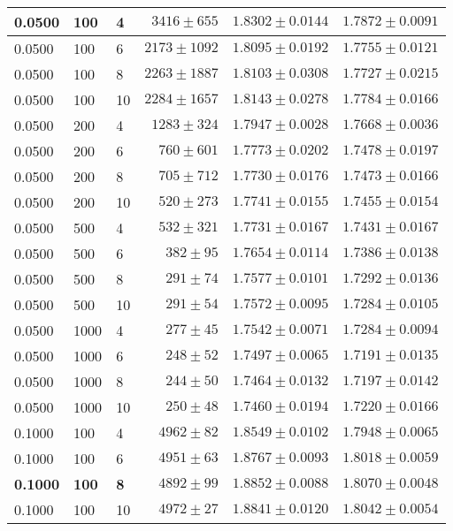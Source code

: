 \begin{table}
\begin{center}
{\begin{tabular}{|l|l|l|r|r|r|}
0.0500 & 100 & 4 & $3416\pm655$ & $1.8302\pm0.0144$ & $1.7872\pm0.0091$ \\ \hline
0.0500 & 100 & 6 & $2173\pm1092$ & $1.8095\pm0.0192$ & $1.7755\pm0.0121$ \\ \hline
0.0500 & 100 & 8 & $2263\pm1887$ & $1.8103\pm0.0308$ & $1.7727\pm0.0215$ \\ \hline
0.0500 & 100 & 10 & $2284\pm1657$ & $1.8143\pm0.0278$ & $1.7784\pm0.0166$ \\ \hline
0.0500 & 200 & 4 & $1283\pm324$ & $1.7947\pm0.0028$ & $1.7668\pm0.0036$ \\ \hline
0.0500 & 200 & 6 & $760\pm601$ & $1.7773\pm0.0202$ & $1.7478\pm0.0197$ \\ \hline
0.0500 & 200 & 8 & $705\pm712$ & $1.7730\pm0.0176$ & $1.7473\pm0.0166$ \\ \hline
0.0500 & 200 & 10 & $520\pm273$ & $1.7741\pm0.0155$ & $1.7455\pm0.0154$ \\ \hline
0.0500 & 500 & 4 & $532\pm321$ & $1.7731\pm0.0167$ & $1.7431\pm0.0167$ \\ \hline
0.0500 & 500 & 6 & $382\pm95$ & $1.7654\pm0.0114$ & $1.7386\pm0.0138$ \\ \hline
0.0500 & 500 & 8 & $291\pm74$ & $1.7577\pm0.0101$ & $1.7292\pm0.0136$ \\ \hline
0.0500 & 500 & 10 & $291\pm54$ & $1.7572\pm0.0095$ & $1.7284\pm0.0105$ \\ \hline
0.0500 & 1000 & 4 & $277\pm45$ & $1.7542\pm0.0071$ & $1.7284\pm0.0094$ \\ \hline
0.0500 & 1000 & 6 & $248\pm52$ & $1.7497\pm0.0065$ & $1.7191\pm0.0135$ \\ \hline
0.0500 & 1000 & 8 & $244\pm50$ & $1.7464\pm0.0132$ & $1.7197\pm0.0142$ \\ \hline
0.0500 & 1000 & 10 & $250\pm48$ & $1.7460\pm0.0194$ & $1.7220\pm0.0166$ \\ \hline

0.1000 & 100 & 4 & $4962\pm82$ & $1.8549\pm0.0102$ & $1.7948\pm0.0065$ \\ \hline
0.1000 & 100 & 6 & $4951\pm63$ & $1.8767\pm0.0093$ & $1.8018\pm0.0059$ \\ \hline
\textbf{0.1000} & \textbf{100} & \textbf{8} & \textbf{$4892\pm99$} & \textbf{$1.8852\pm0.0088$} & \textbf{$1.8070\pm0.0048$} \\ \hline
0.1000 & 100 & 10 & $4972\pm27$ & $1.8841\pm0.0120$ & $1.8042\pm0.0054$ \\ \hline



\end{tabular}}
\end{center}
\end{table}
